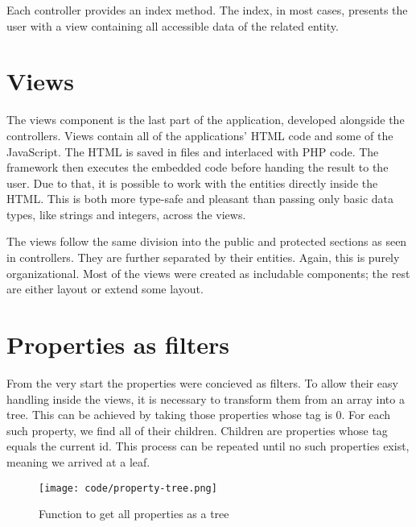 \documentclass[
  digital,     %
  oneside,     %
  nosansbold,  %
  colorbold, %
  lof,         %
  lot,         %
]{fithesis4}
\begin{document}
Each controller provides an index method. The index, in most cases, presents the user with a view
containing all accessible data of the related entity.

\section{Views}

The views component is the last part of the application, developed alongside the controllers. Views
contain all of the applications' HTML code and some of the JavaScript. The HTML is saved in
 files and interlaced with PHP code. The framework then executes the embedded code
before handing the result to the user. Due to that, it is possible to work with the entities directly
inside the HTML. This is both more type-safe and pleasant than passing only basic data types, like
strings and integers, across the views.

The views follow the same division into the public and protected sections as seen in controllers. They
are further separated by their entities. Again, this is purely organizational. Most of the views were
created as includable components; the rest are either layout or extend some layout.

\section{Properties as filters}
\label{sect:properties}

From the very start the properties were concieved as filters. To allow their easy handling inside the
views, it is necessary to transform them from an array into a tree. This can be achieved by taking those
properties whose tag is 0. For each such property, we find all of their children. Children are properties
whose tag equals the current id. This process can be repeated until no such properties exist, meaning
we arrived at a leaf.

\begin{figure}[!htbp]
	\begin{center}
		\begin{minipage}{.8\textwidth}
			\texttt{[image: code/property-tree.png]}
		\end{minipage}
	\end{center}
	\caption{Function to get all properties as a tree}
	\label{fig:property-tree}
\end{figure}
\end{document}
